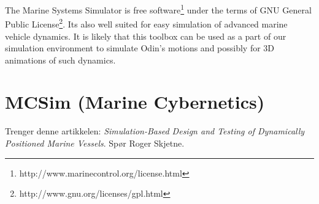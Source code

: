 The Marine Systems Simulator is free software\footnote{http://www.marinecontrol.org/license.html} under the terms of GNU General Public License\footnote{http://www.gnu.org/licenses/gpl.html}. Its also well suited for easy simulation of advanced marine vehicle dynamics. It is likely that this toolbox can be used as a part of our simulation environment to simulate Odin's motions and possibly for 3D animations of such dynamics.

\section{MCSim (Marine Cybernetics)}
Trenger denne artikkelen: \textit{Simulation-Based Design
and Testing of Dynamically Positioned Marine Vessels}. Spør Roger Skjetne.




